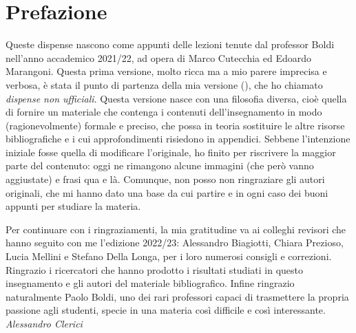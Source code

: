 \chapter{Prefazione}

Queste dispense nascono come appunti delle lezioni tenute dal professor Boldi nell'anno accademico 2021/22, ad opera di Marco Cutecchia ed Edoardo Marangoni.
Questa prima versione, molto ricca ma a mio parere imprecisa e verbosa, è stata il punto di partenza della mia versione (), che ho chiamato \emph{dispense non ufficiali}.
Questa versione nasce con una filosofia diversa, cioè quella di fornire un materiale che contenga i contenuti dell'insegnamento in modo (ragionevolmente) formale e preciso, che possa in teoria sostituire le altre risorse bibliografiche e i cui approfondimenti risiedono in appendici.
Sebbene l'intenzione iniziale fosse quella di modificare l'originale, ho finito per riscrivere la maggior parte del contenuto: oggi ne rimangono alcune immagini (che però vanno aggiustate) e frasi qua e là.
Comunque, non posso non ringraziare gli autori originali, che mi hanno dato una base da cui partire e in ogni caso dei buoni appunti per studiare la materia.

Per continuare con i ringraziamenti, la mia gratitudine va ai colleghi revisori che hanno seguito con me l'edizione 2022/23: Alessandro Biagiotti, Chiara Prezioso, Lucia Mellini e Stefano Della Longa, per i loro numerosi consigli e correzioni.
Ringrazio i ricercatori che hanno prodotto i risultati studiati in questo insegnamento e gli autori del materiale bibliografico.
Infine ringrazio naturalmente Paolo Boldi, uno dei rari professori capaci di trasmettere la propria passione agli studenti, specie in una materia così difficile e così interessante.
\vskip 5mm
\hfill\emph{Alessandro Clerici}
